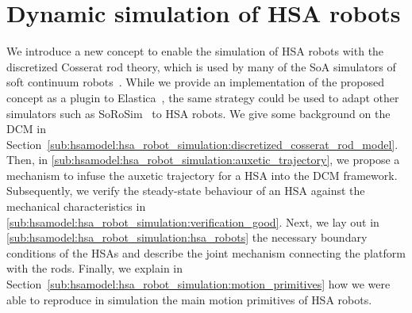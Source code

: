 \section{Dynamic simulation of HSA robots}\label{sec:hsamodel:hsa_robot_simulation}
We introduce a new concept to enable the simulation of \gls{HSA} robots with the discretized Cosserat rod theory, which is used by many of the SoA simulators of soft continuum robots~\cite{naughton2021elastica, mathew2022sorosim}.
While we provide an implementation of the proposed concept as a plugin to Elastica~\cite{naughton2021elastica}, the same strategy could be used to adapt other simulators such as SoRoSim~\cite{mathew2022sorosim} to \gls{HSA} robots.
%
We give some background on the \gls{DCM} in Section~\ref{sub:hsamodel:hsa_robot_simulation:discretized_cosserat_rod_model}. Then, in \ref{sub:hsamodel:hsa_robot_simulation:auxetic_trajectory}, we propose a mechanism to infuse the auxetic trajectory for a \gls{HSA} into the \gls{DCM} framework. Subsequently, we verify the steady-state behaviour of an \gls{HSA} against the mechanical characteristics in \ref{sub:hsamodel:hsa_robot_simulation:verification_good}. Next, we lay out in \ref{sub:hsamodel:hsa_robot_simulation:hsa_robots} the necessary boundary conditions of the \glspl{HSA} and describe the joint mechanism connecting the platform with the rods. Finally, we explain in Section~\ref{sub:hsamodel:hsa_robot_simulation:motion_primitives} how we were able to reproduce in simulation the main motion primitives of \gls{HSA} robots.

